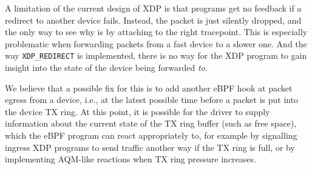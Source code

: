 \documentclass[sigconf]{acmart}
\begin{document}
A limitation of the current design of XDP is that programs get no feedback if a
redirect to another device fails. Instead, the packet is just silently dropped,
and the only way to see why is by attaching to the right tracepoint. This is
especially problematic when forwarding packets from a fast device to a slower
one. And the way \texttt{XDP\_REDIRECT} is implemented, there is no way for the
XDP program to gain insight into the state of the device being forwarded
\emph{to}.

We believe that a possible fix for this is to add another eBPF hook at packet
egress from a device, i.e., at the latest possible time before a packet is put
into the device TX ring. At this point, it is possible for the driver to supply
information about the current state of the TX ring buffer (such as free space),
which the eBPF program can react appropriately to, for example by signalling
ingress XDP programs to send traffic another way if the TX ring is full, or by
implementing AQM-like reactions when TX ring pressure increases.




\end{document}
